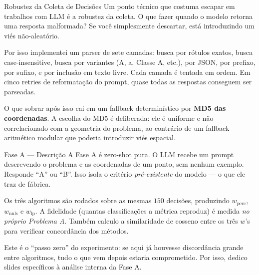 \documentclass[aspectratio=169,10pt]{beamer}
\begin{document}
\begin{frame}{Robustez da Coleta de Decis\~oes}
  \small
  Um ponto t\'ecnico que costuma escapar em trabalhos com LLM \'e a robustez da coleta. O que fazer
  quando o modelo retorna uma resposta malformada? Se voc\^e simplesmente descartar, est\'a introduzindo
  um vi\'es n\~ao-aleat\'orio.
  \medskip

  Por isso implementei um parser de sete camadas: busca por r\'otulos exatos, busca case-insensitive,
  busca por variantes (A, a, Classe A, etc.), por JSON, por prefixo, por sufixo, e por inclus\~ao em
  texto livre. Cada camada \'e tentada em ordem. Em cinco retries de reformata\c{c}\~ao do prompt, quase
  todas as respostas conseguem ser parseadas.
  \medskip

  O que sobrar ap\'os isso cai em um fallback determin\'istico por \textbf{MD5 das coordenadas}. A
  escolha do MD5 \'e deliberada: ele \'e uniforme e n\~ao correlacionado com a geometria do problema,
  ao contr\'ario de um fallback aritm\'etico modular que poderia introduzir vi\'es espacial.
\end{frame}

\begin{frame}{Fase A --- Descri\c{c}\~ao}
  \small
  A Fase A \'e zero-shot pura. O LLM recebe um prompt descrevendo o problema e as coordenadas de um
  ponto, sem nenhum exemplo. Responde ``A'' ou ``B''. Isso isola o crit\'erio \emph{pr\'e-existente}
  do modelo --- o que ele traz de f\'abrica.
  \medskip

  Os tr\^es algoritmos s\~ao rodados sobre as mesmas $150$ decis\~oes, produzindo $w_{\text{perc}}$,
  $w_{\text{nnls}}$ e $w_{\text{lp}}$. A fidelidade (quantas classifica\c{c}\~oes a m\'etrica reproduz)
  \'e medida \emph{no pr\'oprio Problema A}. Tamb\'em calculo a similaridade de cosseno entre os tr\^es
  $w$'s para verificar concord\^ancia dos m\'etodos.
  \medskip

  Este \'e o ``passo zero'' do experimento: se aqui j\'a houvesse discord\^ancia grande entre algoritmos,
  tudo o que vem depois estaria comprometido. Por isso, dedico slides espec\'ificos \`a an\'alise
  interna da Fase A.
\end{frame}
\end{document}
